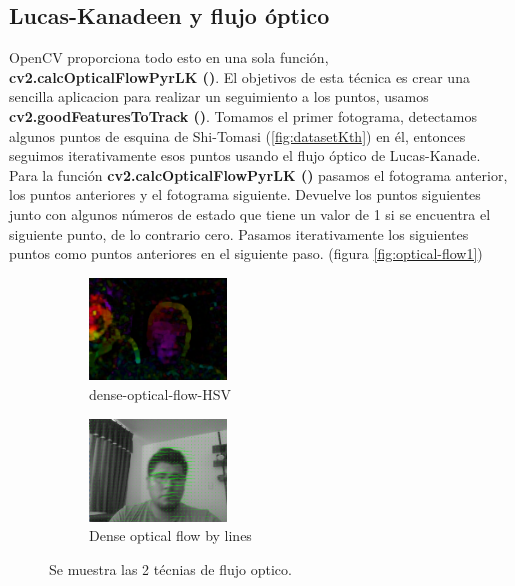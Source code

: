 \subsection{Lucas-Kanadeen y flujo óptico}
OpenCV proporciona todo esto en una sola función, \textbf{cv2.calcOpticalFlowPyrLK ()}. El objetivos de esta técnica es crear una sencilla aplicacion para realizar un seguimiento a los puntos, usamos \textbf{cv2.goodFeaturesToTrack ()}. Tomamos el primer fotograma, detectamos algunos puntos de esquina de Shi-Tomasi (\ref{fig:datasetKth}) en él, entonces seguimos iterativamente esos puntos usando el flujo óptico de Lucas-Kanade. Para la función \textbf{cv2.calcOpticalFlowPyrLK ()} pasamos el fotograma anterior, los puntos anteriores y el fotograma siguiente. Devuelve los puntos siguientes junto con algunos números de estado que tiene un valor de 1 si se encuentra el siguiente punto, de lo contrario cero. Pasamos iterativamente los siguientes puntos como puntos anteriores en el siguiente paso. 
(figura \ref{fig:optical-flow1})

\begin{figure}[h!]

  \begin{subfigure}[]{0.4\linewidth}
      \centering 	  \includegraphics[width=0.4\textwidth]{Kap3/img/Dense_optical_flow_by_HSV_color_image.png}
  \caption{dense-optical-flow-HSV}     
  \label{fig:dense-optical-flow-HSV}
    \end{subfigure}
    
  \begin{subfigure}[]{0.4\linewidth}
      \centering     
 \includegraphics[width=0.4\textwidth]{Kap3/img/Dense_optical_flow_by_lines.png}
  \caption{Dense optical flow by lines}
      \label{fig:Dense_optical_flow_by_lines}
      \end{subfigure}

  \caption{Se muestra las 2 técnias de flujo optico.}
  \label{fig:optical-flow2}
\end{figure}




